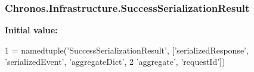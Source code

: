 \subsubsection[{\texorpdfstring{Success\+Serialization\+Result}{SuccessSerializationResult}}]{\setlength{\rightskip}{0pt plus 5cm}Chronos.\+Infrastructure.\+Success\+Serialization\+Result}\hypertarget{group__Chronos_ga9a1d61af6bd14a82c38ec371457b1f1a}{}\label{group__Chronos_ga9a1d61af6bd14a82c38ec371457b1f1a}
{\bfseries Initial value\+:}
\begin{DoxyCode}
1 = namedtuple(\textcolor{stringliteral}{'SuccessSerializationResult'}, [\textcolor{stringliteral}{'serializedResponse'}, \textcolor{stringliteral}{'serializedEvent'}, \textcolor{stringliteral}{'aggregateDict'},
2                                                                        \textcolor{stringliteral}{'aggregate'}, \textcolor{stringliteral}{'requestId'}])
\end{DoxyCode}
